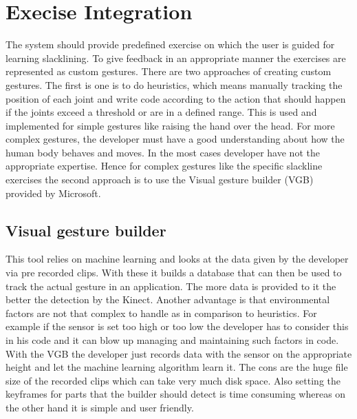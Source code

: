 \section{Execise Integration}\label{5_2_gestureConstruction}
The system should provide predefined exercise on which the user is guided for learning slacklining. To give feedback in an appropriate manner the exercises are represented as custom gestures. There are two approaches of creating custom gestures. The first is one is to do heuristics, which means manually tracking the position of each joint and write code according to the action that should happen if the joints exceed a threshold or are in a defined range. This is used and implemented for simple gestures like raising the hand over the head. For more complex gestures, the developer must have a good understanding about how the human body behaves and moves. In the most cases developer have not the appropriate expertise. Hence for complex gestures like the specific slackline exercises the second approach is to use the Visual gesture builder (VGB) provided by Microsoft.

\subsection{Visual gesture builder}
This tool relies on machine learning and looks at the data given by the developer via pre recorded clips. With these it builds a database that can then be used to track the actual gesture in an application. The more data is provided to it the better the detection by the Kinect. Another advantage is that environmental factors are not that complex to handle as in comparison to heuristics. For example if the sensor is set too high or too low the developer has to consider this in his code and it can blow up managing and maintaining such factors in code. With the VGB the developer just records data with the sensor on the appropriate height and let the machine learning algorithm learn it. The cons are the huge file size of the recorded clips which can take very much disk space. Also setting the keyframes for parts that the builder should detect is time consuming whereas on the other hand it is simple and user friendly.

